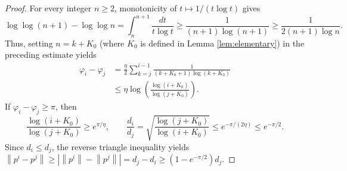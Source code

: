 \documentclass[11pt]{article}
\numberwithin{equation}{section}
\newcommand{\norm}[1]{\left\lVert #1\right\rVert}
\begin{document}
\begin{proof}
For every integer \(n\geq2\), monotonicity of
\(t\mapsto1/(t\log t)\) gives
\[
    \log\log(n+1)-\log\log n
    =
    \int_n^{n+1}\frac{dt}{t\log t}
    \geq
    \frac{1}{(n+1)\log(n+1)}
    \geq
    \frac{1}{2(n+1)\log n}.
\]
Thus, setting \(n=k+K_0\) (where $K_0$ is defined in Lemma \ref{lem:elementary}) in the preceding estimate yields
\begin{align*}
    \varphi_i-\varphi_j
    &=
    \frac{\eta}{2}
    \sum_{k=j}^{i-1}
    \frac{1}{(k+K_0+1)\log(k+K_0)}\\
    &\leq
    \eta
    \log\left(\frac{\log(i+K_0)}{\log(j+K_0)}\right).
\end{align*}
If \(\varphi_i-\varphi_j\geq\pi\), then
\[
    \frac{\log(i+K_0)}{\log(j+K_0)}
    \geq e^{\pi/\eta},
    \qquad
    \frac{d_i}{d_j}
    =
    \sqrt{\frac{\log(j+K_0)}{\log(i+K_0)}}
    \leq e^{-\pi/(2\eta)}
    \leq e^{-\pi/2}.
\]
Since \(d_i\leq d_j\), the reverse triangle inequality yields
$
    \norm{p^i-p^j}
    \geq
    \left|\norm{p^i}-\norm{p^j}\right|
    =
    d_j-d_i
    \geq
    (1-e^{-\pi/2})d_j.$
\end{proof}
\end{document}
